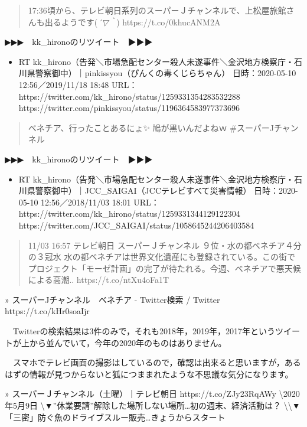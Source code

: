 \documentclass[]{ltjarticle}
\providecommand{\tightlist}{%
  \setlength{\itemsep}{0pt}\setlength{\parskip}{0pt}}
\begin{document}
\begin{quote}
17:36頃から、テレビ朝日系列のスーパーＪチャンネルで、上松屋旅館さんも出るようです(\emph{´▽｀})
https://t.co/0khucANM2A
\end{quote}

▶▶▶　kk\_hironoのリツイート　▶▶▶

\begin{itemize}
\tightlist
\item
  RT
  kk\_hirono（告発＼市場急配センター殺人未遂事件＼金沢地方検察庁・石川県警察御中）｜pinkissyou（ぴんくの毒くじらちゃん）
  日時：2020-05-10 12:56／2019/11/18 18:48 URL：
  https://twitter.com/kk\_hirono/status/1259331354283532288
  https://twitter.com/pinkissyou/status/1196364583977373696
\end{itemize}

\begin{quote}
ベネチア、行ったことあるにょ✨ 鳩が黒いんだよねｗ \#スーパーJチャンネル
\end{quote}

▶▶▶　kk\_hironoのリツイート　▶▶▶

\begin{itemize}
\tightlist
\item
  RT
  kk\_hirono（告発＼市場急配センター殺人未遂事件＼金沢地方検察庁・石川県警察御中）｜JCC\_SAIGAI（JCCテレビすべて災害情報）
  日時：2020-05-10 12:56／2018/11/03 18:01 URL：
  https://twitter.com/kk\_hirono/status/1259331344129122304
  https://twitter.com/JCC\_SAIGAI/status/1058645244206403584
\end{itemize}

\begin{quote}
11/03 16:57 テレビ朝日 スーパーＪチャンネル
９位・水の都ベネチア４分の３冠水
水の都ベネチアは世界文化遺産にも登録されている。この街でプロジェクト「モーゼ計画」の完了が待たれる。今週、ベネチアで悪天候による高潮..
https://t.co/ntXu4oFa1T
\end{quote}

» スーパーJチャンネル　ベネチア - Twitter検索 / Twitter
https://t.co/kHr0soaIjr

　Twitterの検索結果は3件のみで，それも2018年，2019年，2017年というツイートが上から並んでいて，今年の2020年のものはありません。

　スマホでテレビ画面の撮影はしているので，確認は出来ると思いますが，あるはずの情報が見つからないと狐につままれたような不思議な気分になります。

» スーパーＪチャンネル（土曜）｜テレビ朝日 https://t.co/ZJy23RqAWy
\textbackslash 2020年5月9日
\textbackslash ▼''休業要請''解除した場所しない場所\ldots{}初の週末、経済活動は？
\textbackslash  \textbackslash ▼「三密」防ぐ魚のドライブスルー販売\ldots{}きょうからスタート
\end{document}
